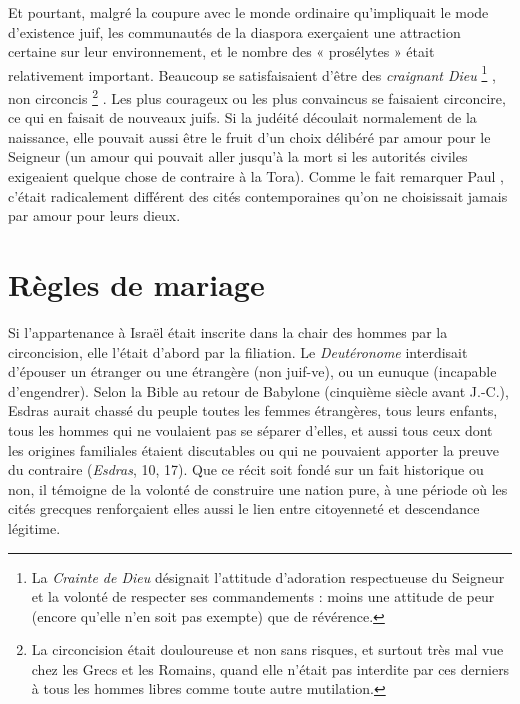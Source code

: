  Et pourtant, malgré la coupure avec le monde ordinaire qu'impliquait le mode d'existence juif, les communautés de la diaspora exerçaient une attraction certaine sur leur environnement, et le nombre des « prosélytes » était relativement important. Beaucoup se satisfaisaient d'être des \emph{craignant Dieu}%
\footnote{La \emph{Crainte de Dieu} désignait l'attitude d'adoration respectueuse du Seigneur et la volonté de respecter ses commandements : moins une attitude de peur (encore qu'elle n'en soit pas exempte) que de révérence.}%
, non circoncis%
\footnote{La circoncision était douloureuse et non sans risques, et surtout très mal vue chez les Grecs et les Romains, quand elle n'était pas interdite par ces derniers à tous les hommes libres comme toute autre mutilation.}%
. Les plus courageux ou les plus convaincus se faisaient circoncire, ce qui en faisait de nouveaux juifs. Si la judéité découlait normalement de la naissance, elle pouvait aussi être le fruit d'un choix délibéré par amour pour le Seigneur (un amour qui pouvait aller jusqu'à la mort si les autorités civiles exigeaient quelque chose de contraire à la Tora). Comme le fait remarquer Paul , c'était radicalement différent des cités contemporaines qu'on ne choisissait jamais par amour pour leurs dieux.

 
 
 
\section{Règles de mariage}

 Si l'appartenance à Israël était inscrite dans la chair des hommes par la circoncision,  elle l'était d'abord par la filiation. Le \emph{Deutéronome} interdisait d'épouser un étranger ou une étrangère (non juif-ve), ou un eunuque (incapable d'engendrer). Selon la Bible au retour de Babylone (cinquième siècle avant J.-C.), Esdras aurait chassé du peuple toutes les femmes étrangères, tous leurs enfants, tous les hommes qui ne voulaient pas se séparer d'elles, et aussi tous ceux dont les origines familiales étaient discutables ou qui ne pouvaient apporter la preuve du contraire (\emph{Esdras}, 10, 17). Que ce récit soit fondé sur un fait historique ou non, il témoigne de la volonté de construire une nation pure, à une période où les cités grecques renforçaient elles aussi le lien entre citoyenneté et descendance légitime. 

